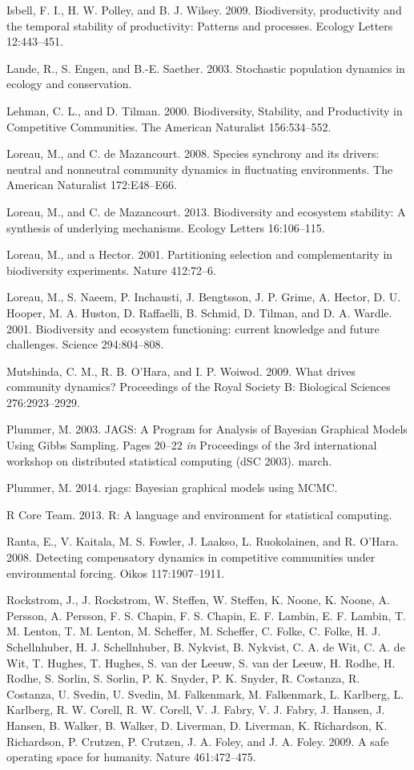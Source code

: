 \documentclass[12pt,]{article}
\begin{document}
Isbell, F. I., H. W. Polley, and B. J. Wilsey. 2009. Biodiversity,
productivity and the temporal stability of productivity: Patterns and
processes. Ecology Letters 12:443--451.

Lande, R., S. Engen, and B.-E. Saether. 2003. Stochastic population
dynamics in ecology and conservation.

Lehman, C. L., and D. Tilman. 2000. Biodiversity, Stability, and
Productivity in Competitive Communities. The American Naturalist
156:534--552.

Loreau, M., and C. {{de Mazancourt}}. 2008. Species synchrony and its
drivers: neutral and nonneutral community dynamics in fluctuating
environments. The American Naturalist 172:E48--E66.

Loreau, M., and C. {{de Mazancourt}}. 2013. Biodiversity and ecosystem
stability: A synthesis of underlying mechanisms. Ecology Letters
16:106--115.

Loreau, M., and a Hector. 2001. Partitioning selection and
complementarity in biodiversity experiments. Nature 412:72--6.

Loreau, M., S. Naeem, P. Inchausti, J. Bengtsson, J. P. Grime, A.
Hector, D. U. Hooper, M. A. Huston, D. Raffaelli, B. Schmid, D. Tilman,
and D. A. Wardle. 2001. Biodiversity and ecosystem functioning: current
knowledge and future challenges. Science 294:804--808.

Mutshinda, C. M., R. B. O'Hara, and I. P. Woiwod. 2009. What drives
community dynamics? Proceedings of the Royal Society B: Biological
Sciences 276:2923--2929.

Plummer, M. 2003. JAGS: A Program for Analysis of Bayesian Graphical
Models Using Gibbs Sampling. Pages 20--22 \emph{in} Proceedings of the
3rd international workshop on distributed statistical computing (dSC
2003). march.

Plummer, M. 2014. rjags: Bayesian graphical models using MCMC.

R Core Team. 2013. R: A language and environment for statistical
computing.

Ranta, E., V. Kaitala, M. S. Fowler, J. Laakso, L. Ruokolainen, and R.
O'Hara. 2008. Detecting compensatory dynamics in competitive communities
under environmental forcing. Oikos 117:1907--1911.

Rockstrom, J., J. Rockstrom, W. Steffen, W. Steffen, K. Noone, K. Noone,
A. Persson, A. Persson, F. S. Chapin, F. S. Chapin, E. F. Lambin, E. F.
Lambin, T. M. Lenton, T. M. Lenton, M. Scheffer, M. Scheffer, C. Folke,
C. Folke, H. J. Schellnhuber, H. J. Schellnhuber, B. Nykvist, B.
Nykvist, C. A. de Wit, C. A. de Wit, T. Hughes, T. Hughes, S. van der
Leeuw, S. van der Leeuw, H. Rodhe, H. Rodhe, S. Sorlin, S. Sorlin, P. K.
Snyder, P. K. Snyder, R. Costanza, R. Costanza, U. Svedin, U. Svedin, M.
Falkenmark, M. Falkenmark, L. Karlberg, L. Karlberg, R. W. Corell, R. W.
Corell, V. J. Fabry, V. J. Fabry, J. Hansen, J. Hansen, B. Walker, B.
Walker, D. Liverman, D. Liverman, K. Richardson, K. Richardson, P.
Crutzen, P. Crutzen, J. A. Foley, and J. A. Foley. 2009. A safe
operating space for humanity. Nature 461:472--475.
\end{document}
